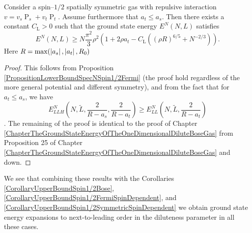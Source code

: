 \begin{theorem}
	\label{TheoremLowerBoundSpinDependentSpin1/2SpatiallySymmetric}
	Consider a spin--$ 1/2 $ spatially symmetric gas with repulsive interaction  $v=v_s\operatorname{P}_s+v_t\operatorname{P}_t$. Assume furthermore that $ a_t\leq a_s $. Then there exists a constant $C_\text{L}>0$ such that the ground state energy $E^N(N,L)$ satisfies
	\begin{equation}
	\label{eqlower}
	E^N(N,L)\geq N\frac{\pi^2}{3}\rho^2\left(1+2\rho a_t-C_\text{L}\left((\rho R)^{6/5}+N^{-2/3}\right)\right).
	\end{equation}
	Here $ R=\max(\left\lvert a_s \right\rvert, \left\lvert a_t \right\rvert, R_0) $
\end{theorem}
\begin{proof}
	This follows from Proposition \ref{PropositionLowerBoundSpecNSpin1/2Fermi} (the proof hold regardless of the more general potential and different symmetry), and from the fact that for $ a_t\leq a_s $, we have $$ E_{LLH}^N\left(N,\tilde{L},\frac{2}{R-a_s},\frac{2}{R-a_t}\right)\geq E^N_{LL}\left(N,\tilde{L},\frac{2}{R-a_t}\right) $$. The remaining of the proof is identical to the proof of Chapter \ref{ChapterTheGroundStateEnergyOfTheOneDimensionalDiluteBoseGas} from Proposition 25 of Chapter \ref{ChapterTheGroundStateEnergyOfTheOneDimensionalDiluteBoseGas} and down.
\end{proof}
We see that combining these results with the Corollaries \ref{CorollaryUpperBoundSpin1/2Bose}, \ref{CorollaryUpperBoundSpin1/2FermiSpinDependent}, and \ref{CorollaryUpperBoundSpin1/2SymmetricSpinDependent} we obtain ground state energy expansions to next-to-leading order in the diluteness parameter in all these cases. 


\appendix

